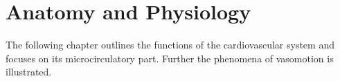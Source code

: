 \chapter{Anatomy and Physiology}
The following chapter outlines the functions of the cardiovascular system and focuses on its microcirculatory part. Further the phenomena of vasomotion is illustrated.